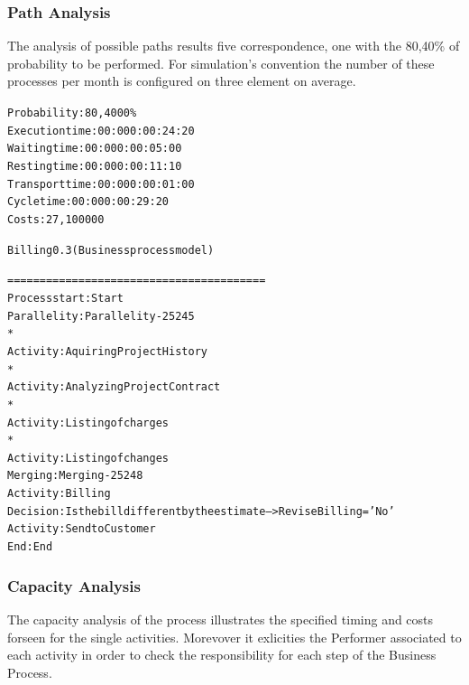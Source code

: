 \subsubsection{Path Analysis}
The analysis of possible paths results five correspondence, one with the 80,40\% of probability to be performed. For simulation's convention the number of these processes per month is configured on three element on average.

\begin{alltt}
Probability:   80,4000\%
Execution time:  00:000:00:24:20
Waiting time:  00:000:00:05:00
Resting time:  00:000:00:11:10
Transport time:  00:000:00:01:00
Cycle time:  00:000:00:29:20
Costs:  27,100000

Billing 0.3 (Business process model)

========================================
Process start: Start
Parallelity: Parallelity-25245
    *
    Activity: Aquiring Project History
    *
    Activity: Analyzing Project Contract
    *
    Activity: Listing of charges
    *
    Activity: Listing of changes
Merging: Merging-25248
Activity: Billing
Decision: Is the bill different by the estimate --> ReviseBilling = 'No'
Activity: Send to Customer
End: End
\end{alltt}


\subsubsection{Capacity Analysis}
The capacity analysis of the process illustrates the specified timing and costs forseen for the single activities. Morevover it exlicities the Performer associated to each activity in order to check the responsibility for each step of the Business Process.

